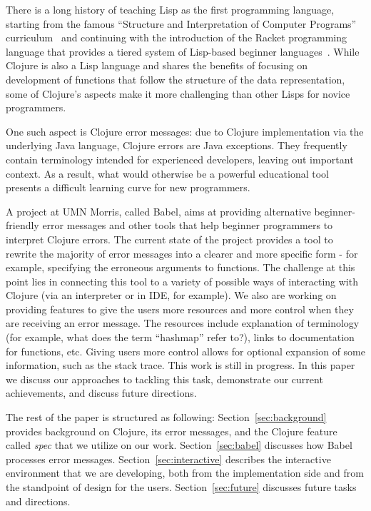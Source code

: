\documentclass[12pt]{article}
\newcommand{\comment}[1]{{\bf \tt  {#1}}}
\newcommand{\emcomment}[1]{\textcolor{ForestGreen}{\comment{Elena: {#1}}}}
\begin{document}
There is a long history of teaching Lisp as the first programming language, starting from the famous  ``Structure and Interpretation of Computer Programs'' curriculum~\cite{Abelson} and continuing with the introduction of the 
Racket programming language that provides a tiered system of Lisp-based beginner languages~\cite{Felleisen:2004,racket}. While Clojure is also a Lisp language and shares the benefits of focusing on development of functions that follow the structure of the data representation, some of Clojure's aspects make it more challenging than other Lisps for novice programmers. 

One such aspect is Clojure error messages: due to Clojure implementation via the underlying Java language, 
Clojure errors are Java exceptions. 
They frequently contain terminology intended for experienced developers, leaving out important context. 
As a result, what would otherwise be a powerful educational tool presents a difficult learning curve for new programmers.

A project at UMN Morris, called Babel, aims at providing alternative beginner-friendly error messages and other tools that help beginner programmers to interpret Clojure errors. 
The current state of the project provides a tool to rewrite the majority of error messages into a clearer and more specific form - for example, specifying the erroneous arguments to functions. 
The challenge at this point lies in connecting this tool to a variety of possible ways of interacting with Clojure (via an interpreter or in IDE, for example). 
We also are working on providing features to give the users more resources and more control when they are receiving an error message. The resources include explanation of terminology (for example, what does the term ``hashmap'' refer to?), links to documentation for functions, etc. Giving users more control allows for optional expansion of some information, such as the stack trace. 
This work is still in progress. 
In this paper we discuss our approaches to tackling this task, demonstrate our current achievements, and discuss future directions. 

The rest of the paper is structured as following:
Section~\ref{sec:background} provides background on Clojure, its error messages, and the Clojure feature called {\it spec} that we utilize on our work. Section~\ref{sec:babel} discusses how Babel processes error messages. 
Section~\ref{sec:interactive} describes the interactive environment that we are developing, both from the implementation side and from the standpoint of design for the users. 
Section~\ref{sec:future} discusses future tasks and directions.  
\end{document}
